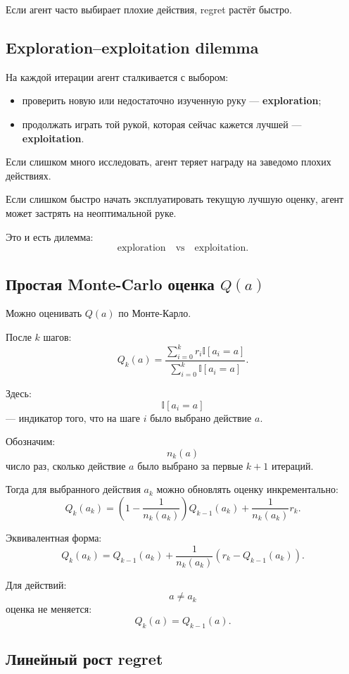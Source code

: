 \documentclass[12pt,a4paper]{article}
\begin{document}
Если агент часто выбирает плохие действия, regret растёт быстро.

\subsection{Exploration--exploitation dilemma}

На каждой итерации агент сталкивается с выбором:

\begin{itemize}
    \item проверить новую или недостаточно изученную руку --- \textbf{exploration};
    \item продолжать играть той рукой, которая сейчас кажется лучшей --- \textbf{exploitation}.
\end{itemize}

Если слишком много исследовать, агент теряет награду на заведомо плохих действиях.

Если слишком быстро начать эксплуатировать текущую лучшую оценку, агент может застрять на неоптимальной руке.

Это и есть дилемма:
\[
\text{exploration}
\quad
\text{vs}
\quad
\text{exploitation}.
\]

\subsection{Простая Monte-Carlo оценка $Q(a)$}

Можно оценивать $Q(a)$ по Монте-Карло.

После $k$ шагов:
\[
Q_k(a)
=
\frac{
\sum_{i=0}^{k}
r_i \mathbb I[a_i=a]
}{
\sum_{i=0}^{k}
\mathbb I[a_i=a]
}.
\]

Здесь:
\[
\mathbb I[a_i=a]
\]
--- индикатор того, что на шаге $i$ было выбрано действие $a$.

Обозначим:
\[
n_k(a)
\]
число раз, сколько действие $a$ было выбрано за первые $k+1$ итераций.

Тогда для выбранного действия $a_k$ можно обновлять оценку инкрементально:
\[
Q_k(a_k)
=
\left(
1-\frac{1}{n_k(a_k)}
\right)
Q_{k-1}(a_k)
+
\frac{1}{n_k(a_k)}
r_k.
\]

Эквивалентная форма:
\[
Q_k(a_k)
=
Q_{k-1}(a_k)
+
\frac{1}{n_k(a_k)}
\left(
r_k-Q_{k-1}(a_k)
\right).
\]

Для действий:
\[
a\ne a_k
\]
оценка не меняется:
\[
Q_k(a)=Q_{k-1}(a).
\]

\subsection{Линейный рост regret}
\end{document}
